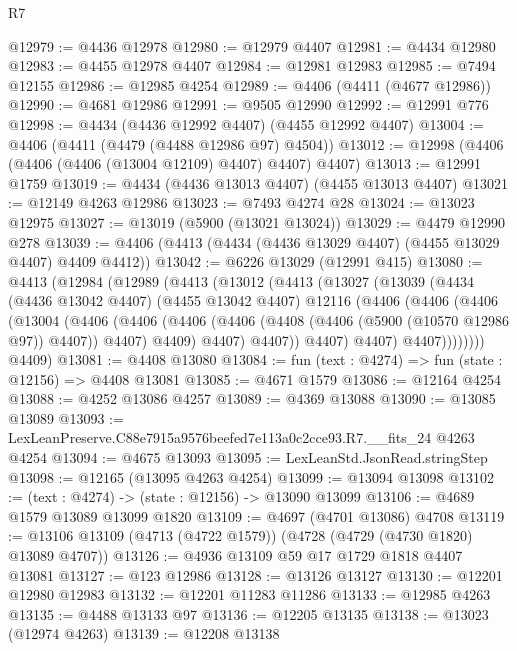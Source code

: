 \begin{lexlean}{R7}
\begin{coremodule}
@12979 := @4436 @12978
@12980 := @12979 @4407
@12981 := @4434 @12980
@12983 := @4455 @12978 @4407
@12984 := @12981 @12983
@12985 := @7494 @12155
@12986 := @12985 @4254
@12989 := @4406 (@4411 (@4677 @12986))
@12990 := @4681 @12986
@12991 := @9505 @12990
@12992 := @12991 @776
@12998 := @4434 (@4436 @12992 @4407) (@4455 @12992 @4407)
@13004 := @4406 (@4411 (@4479 (@4488 @12986 @97) @4504))
@13012 := @12998 (@4406 (@4406 (@4406 (@13004 @12109) @4407) @4407) @4407)
@13013 := @12991 @1759
@13019 := @4434 (@4436 @13013 @4407) (@4455 @13013 @4407)
@13021 := @12149 @4263 @12986
@13023 := @7493 @4274 @28
@13024 := @13023 @12975
@13027 := @13019 (@5900 (@13021 @13024))
@13029 := @4479 @12990 @278
@13039 := @4406 (@4413 (@4434 (@4436 @13029 @4407) (@4455 @13029 @4407) @4409 @4412))
@13042 := @6226 @13029 (@12991 @415)
@13080 := @4413
    (@12984
      (@12989
        (@4413
          (@13012
            (@4413
              (@13027
                (@13039
                  (@4434
                    (@4436 @13042 @4407)
                    (@4455 @13042 @4407)
                    @12116
                    (@4406
                      (@4406
                        (@4406
                          (@13004
                            (@4406
                              (@4406
                                (@4406
                                  (@4406 (@4408 (@4406 (@5900 (@10570 @12986 @97)) @4407)) @4407)
                                  @4409)
                                @4407)
                              @4407))
                          @4407)
                        @4407)
                      @4407))))))))
      @4409)
@13081 := @4408 @13080
@13084 := fun (text : @4274) => fun (state : @12156) => @4408 @13081
@13085 := @4671 @1579
@13086 := @12164 @4254
@13088 := @4252 @13086 @4257
@13089 := @4369 @13088
@13090 := @13085 @13089
@13093 := LexLeanPreserve.C88e7915a9576beefed7e113a0c2cce93.R7.__fits_24 @4263 @4254
@13094 := @4675 @13093
@13095 := LexLeanStd.JsonRead.stringStep
@13098 := @12165 (@13095 @4263 @4254)
@13099 := @13094 @13098
@13102 := (text : @4274) -> (state : @12156) -> @13090 @13099
@13106 := @4689 @1579 @13089 @13099 @1820
@13109 := @4697 (@4701 @13086) @4708
@13119 := @13106 @13109 (@4713 (@4722 @1579)) (@4728 (@4729 (@4730 @1820) @13089 @4707))
@13126 := @4936 @13109 @59 @17 @1729 @1818 @4407 @13081
@13127 := @123 @12986
@13128 := @13126 @13127
@13130 := @12201 @12980 @12983
@13132 := @12201 @11283 @11286
@13133 := @12985 @4263
@13135 := @4488 @13133 @97
@13136 := @12205 @13135
@13138 := @13023 (@12974 @4263)
@13139 := @12208 @13138

\end{coremodule}
\end{lexlean}

